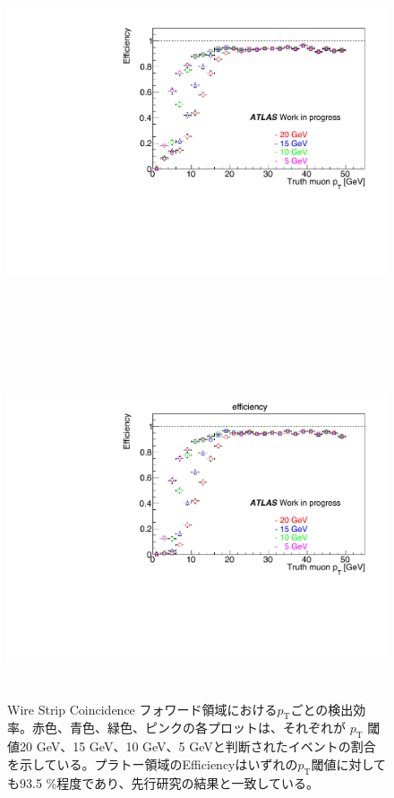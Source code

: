\begin{figure}
    \begin{minipage}[b]{\linewidth}
    \centering
    \includegraphics[height=10cm]{fig/Test/A_SM_ws_turn.pdf}
    \end{minipage}\\
    \begin{minipage}[b]{\linewidth}
    \centering
    \includegraphics[height=10cm]{fig/Test/A_SM_ws_turnon_bitwise.pdf}
    \end{minipage}%
    \caption[Wire Strip Coincidenceの$p_\mathrm{T}$ごとの検出効率]{Wire Strip Coincidence フォワード領域における$p_\mathrm{T}$ごとの検出効率。赤色、青色、緑色、ピンクの各プロットは、それぞれが $p_{\mathrm{T}}$ 閾値20 GeV、15 GeV、10 GeV、5 GeVと判断されたイベントの割合を示している。プラトー領域のEfficiencyはいずれの$p_{\mathrm{T}}$閾値に対しても93.5 \%程度であり、先行研究の結果と一致している。}
    \label{SM_A_WS_turnon}
\end{figure}

